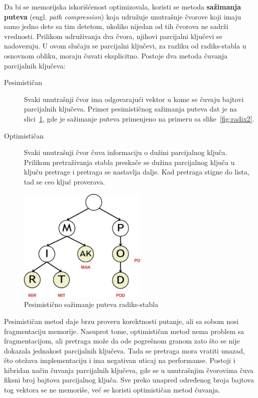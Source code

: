 \documentclass[12pt,oneside]{memoir}
\begin{document}
Da bi se memorijska iskorišćenost optimizovala, koristi se metoda
\textbf{sažimanja puteva} (engl. \emph{path compression}) koja udružuje unutrašnje
čvorove koji imaju samo jedno dete sa tim detetom, ukoliko nijedan
od tih čvorova ne sadrži vrednosti. Prilikom udruživanja dva čvora,
njihovi parcijalni ključevi se nadovezuju. U ovom slučaju se parcijalni ključevi,
za razliku od radiks-stabla u osnovnom obliku, moraju čuvati eksplicitno.
Postoje dva metoda čuvanja parcijalnih ključeva:

\begin{description}
  \item[Pesimističan] Svaki unutrašnji čvor ima odgovarajući vektor
        u kome se čuvaju bajtovi parcijalnih ključeva. Primer pesimističnog
        sažimanja puteva dat je na slici~\ref{fig:radix_compression},
        gde je sažimanje puteva primenjeno na primeru sa
        slike~\ref{fig:radix2}.
  \item[Optimističan] Svaki unutrašnji čvor čuva informaciju o dužini
        parcijalnog ključa. Prilikom pretraživanja stabla preskače se dužina
        parcijalnog ključa u ključu pretrage i pretraga se nastavlja dalje.
        Kad pretraga stigne do lista, tad se ceo ključ proverava.
\end{description}


\begin{figure}[!h]
  \centering
  \includegraphics[width=0.55\textwidth]{radix_compression.eps}
  \caption{Pesimistično sažimanje puteva radiks-stabla}
  \label{fig:radix_compression}
\end{figure}

Pesimističan metod daje brzu proveru korektnosti putanje, ali sa sobom nosi
fragmentaciju memorije. Nasuprot tome, optimističan metod nema problem sa
fragmentacijom, ali pretraga može da ode pogrešnom granom zato što se
nije dokazala jednakost parcijalnih ključeva. Tada se
pretraga mora vratiti unazad, što otežava implementaciju i ima negativan
uticaj na performanse. Postoji i hibridan način čuvanja parcijalnih ključeva,
gde se u unutrašnjim čvorovima čuva fiksni broj bajtova parcijalnog ključa.
Sve preko unapred određenog broja bajtova tog vektora se ne memoriše,
već se koristi optimističan metod čuvanja.
\end{document}
